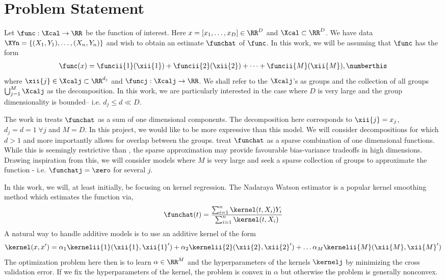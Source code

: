 
\section{Problem Statement}

Let $\func : \Xcal \rightarrow \RR$ be the function of interest. 
Here $x = [x_1, \dots, x_D] \in \RR^D$ and $\Xcal \subset \RR^D$.
We have data $\XYn = \{(X_1, Y_1), \dots, (X_n, Y_n) \}$ and wish to obtain an estimate
$\funchat$ of $\func$.
In this work, we will be assuming that $\func$ has the form
\begin{align*}
\func(x) = \funcii{1}(\xii{1}) + \funcii{2}(\xii{2}) + \dots +
\funcii{M}(\xii{M}),
\numberthis
\label{eqn:addAssumption}
\end{align*}
where $\xii{j} \in \Xcalj \subset \RR^{d_j}$ and $\funcj:\Xcalj \rightarrow
\RR$. We shall refer to the $\Xcalj$'s as groups and the collection of all
groups $\bigcup_{j=1}^M \Xcalj$ as the decomposition.
In this work, we are particularly  interested in the case
where $D$ is very large and the group dimensionality is bounded-- i.e. $d_j \leq
d \ll D$. 

The work in \citet{hastie90gam} treats $\funchat$ as a sum of one
dimensional components. The decomposition here corresponds to
$\xii{j} = x_j$, $d_j = d =1\; \forall j$ and $M = D$. 
In this project, we would like to be more expressive than this model. We will
consider decompositions for which $d > 1$ and more importantly allows for
overlap between the groups.
\citet{ravikumar09spam} treat $\funchat$ as a sparse combination of one
dimensional functions. While this is seemingly restrictive than
\citep{hastie90gam}, the sparse approximation may provide favourable
bias-variance tradeoffs in high dimensions. Drawing inspiration from this, we
will consider models where $M$ is very large and seek a sparse collection of
groups to approximate the function - i.e. $\funchatj = \zero$ for several $j$.

In this work, we will, at least initially, be focusing on kernel regression. The Nadaraya
Watson estimator \cite{tsybakov08nonparametric} is a popular kernel smoothing method which
estimates the function via,
\[
\funchat(t) =  \frac{\sum_{i=1}^n\kernel(t,X_i) Y_i }{\sum_{i=1}^n \kernel(t,X_i)}
\]
A natural way to handle additive models is to use an additive kernel of the form
\[
\kernel(x,x') = 
\alpha_1\kernelii{1}(\xii{1}, {\xii{1}}') +
\alpha_2\kernelii{2}(\xii{2}, {\xii{2}}') + \dots
\alpha_M\kernelii{M}(\xii{M}, {\xii{M}}')
\]
The optimization problem here then is to learn 
$\alpha \in \RR^M$ and the hyperparameters of the kernels $\kernelj$ by minimizing the
cross validation error. If we fix the hyperparameters of the kernel, the problem
is convex in $\alpha$ but otherwise the problem is generally nonconvex.

